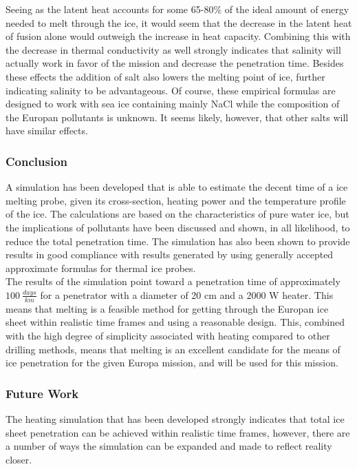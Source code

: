 \noindent
Seeing as the latent heat accounts for some 65-80\% of the ideal amount of energy needed to melt through the ice, it would seem that the decrease in the latent heat of fusion alone would outweigh the increase in heat capacity. Combining this with the decrease in thermal conductivity as well strongly indicates that salinity will actually work in favor of the mission and decrease the penetration time. Besides these effects the addition of salt also lowers the melting point of ice, further indicating salinity to be advantageous. Of course, these empirical formulas are designed to work with sea ice containing mainly NaCl while the composition of the Europan pollutants is unknown. It seems likely, however, that other salts will have similar effects. 

\subsubsection{Conclusion}
A simulation has been developed that is able to estimate the decent time of a ice melting probe, given its cross-section, heating power and the temperature profile of the ice. The calculations are based on the characteristics of pure water ice, but the implications of pollutants have been discussed and shown, in all likelihood, to reduce the total penetration time. The simulation has also been shown to provide results in good compliance with results generated by using generally accepted approximate formulas for thermal ice probes. \\

\noindent
The results of the simulation point toward a penetration time of approximately $\SI{100}{\frac{days}{km}}$ for a penetrator with a diameter of 20 cm and a 2000 W heater. This means that melting is a feasible method for getting through the Europan ice sheet within realistic time frames and using a reasonable design. This, combined with the high degree of simplicity associated with heating compared to other drilling methods, means that melting is an excellent candidate for the means of ice penetration for the given Europa mission, and will be used for this mission.

\subsubsection{Future Work}
The heating simulation that has been developed strongly indicates that total ice sheet penetration can be achieved within realistic time frames, however, there are a number of ways the simulation can be expanded and made to reflect reality closer.\\

